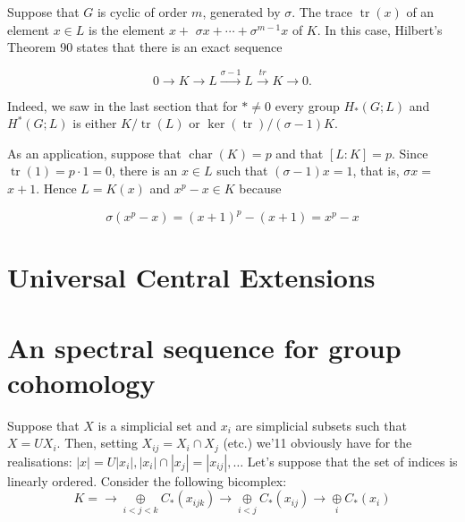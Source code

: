 \begin{example}
Suppose that $G$ is cyclic of order $m$, generated by $\sigma$. The trace $\operatorname{tr}(x)$ of an element $x \in L$ is the element $x+$ $\sigma x+\cdots+\sigma^{m-1} x$ of $K$. In this case, Hilbert's Theorem 90 states that there is an exact sequence

    $$
    0 \rightarrow K \rightarrow L \xrightarrow{\sigma-1} L \xrightarrow{t r} K \rightarrow 0 .
    $$
    
    
    Indeed, we saw in the last section that for $* \neq 0$ every group $H_*(G ; L)$ and $H^*(G ; L)$ is either $K / \operatorname{tr}(L)$ or $\operatorname{ker}(\operatorname{tr}) /(\sigma-1) K$.
    
    As an application, suppose that $\operatorname{char}(K)=p$ and that $[L: K]=p$. Since $\operatorname{tr}(1)=p \cdot 1=0$, there is an $x \in L$ such that $(\sigma-1) x=1$, that is, $\sigma x=$ $x+1$. Hence $L=K(x)$ and $x^p-x \in K$ because
    
    $$
    \sigma\left(x^p-x\right)=(x+1)^p-(x+1)=x^p-x
    $$
\end{example}




\section{Universal Central Extensions}







\newpage
\section{An spectral sequence for group cohomology}
Suppose that $X$ is a simplicial set and $x_i$ are simplicial subsets such that $X=U X_i$. Then, setting $X_{i j}=X_i \cap X_j$ (etc.) we'11 obviously have for the realisations: $|x|=U\left|x_i\right|,\left|x_i\right| \cap\left|x_j\right|=\left|x_{i j}\right|, \ldots$ Let's suppose that the set of indices is linearly ordered. Consider the following bicomplex:
$$ K = \longrightarrow \underset{i<j<k}{\oplus} C_*\left(x_{i j k}\right) \longrightarrow \underset{i<j}{\oplus} C_*\left(x_{i j}\right)\longrightarrow \underset{i}{\oplus} C_*\left(x_{i}\right) $$


